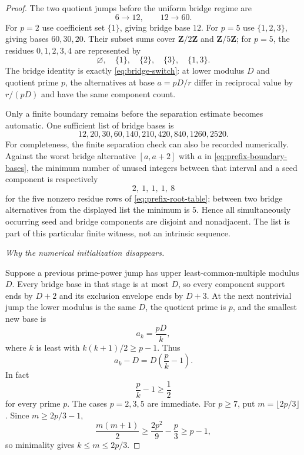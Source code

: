 \begin{proof}
The two quotient jumps before the uniform bridge regime are
\[
6\longrightarrow12,
\qquad
12\longrightarrow60.
\]
For $p=2$ use coefficient set $\{1\}$, giving bridge base $12$.  For $p=5$ use $\{1,2,3\}$, giving bases $60,30,20$.  Their subset sums cover $\mathbf Z/2\mathbf Z$ and $\mathbf Z/5\mathbf Z$; for $p=5$, the residues $0,1,2,3,4$ are represented by
\[
\varnothing,\quad\{1\},\quad\{2\},\quad\{3\},\quad\{1,3\}.
\]
The bridge identity is exactly \eqref{eq:bridge-switch}: at lower modulus $D$ and quotient prime $p$, the alternatives at base $a=pD/r$ differ in reciprocal value by $r/(pD)$ and have the same component count.

Only a finite boundary remains before the separation estimate becomes automatic.  One sufficient list of bridge bases is
\begin{equation}\label{eq:prefix-boundary-bases}
12,20,30,60,140,210,420,840,1260,2520.
\end{equation}
For completeness, the finite separation check can also be recorded numerically.  Against the worst bridge alternative $[a,a+2]$ with $a$ in \eqref{eq:prefix-boundary-bases}, the minimum number of unused integers between that interval and a seed component is respectively
\[
2,\ 1,\ 1,\ 1,\ 8
\]
for the five nonzero residue rows of \eqref{eq:prefix-root-table}; between two bridge alternatives from the displayed list the minimum is $5$.  Hence all simultaneously occurring seed and bridge components are disjoint and nonadjacent.  The list is part of this particular finite witness, not an intrinsic sequence.

\smallskip
\noindent\emph{Why the numerical initialization disappears.}

Suppose a previous prime-power jump has upper least-common-multiple modulus $D$.  Every bridge base in that stage is at most $D$, so every component support ends by $D+2$ and its exclusion envelope ends by $D+3$.  At the next nontrivial jump the lower modulus is the same $D$, the quotient prime is $p$, and the smallest new base is
\[
a_k=\frac{pD}{k},
\]
where $k$ is least with $k(k+1)/2\ge p-1$.  Thus
\begin{equation}\label{eq:successive-row-gap}
a_k-D=D\left(\frac pk-1\right).
\end{equation}
In fact
\[
\frac pk-1\ge\frac12
\]
for every prime $p$.  The cases $p=2,3,5$ are immediate.  For $p\ge7$, put $m=\lfloor2p/3\rfloor$.  Since $m\ge2p/3-1$,
\[
\frac{m(m+1)}2
\ge\frac{2p^2}{9}-\frac p3
\ge p-1,
\]
so minimality gives $k\le m\le2p/3$.


\end{proof}

